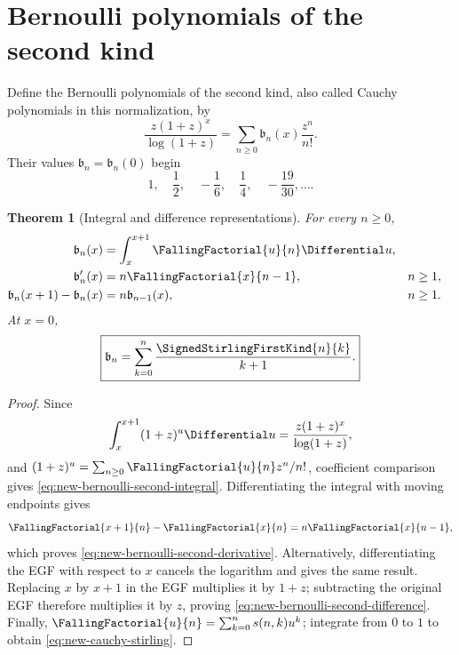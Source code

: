 \documentclass[11pt,a4paper,oneside,openany]{book}
\newtheorem{theorem}{Theorem}[chapter]
\theoremstyle{definition}
\theoremstyle{remark}
\begin{document}
\section{Bernoulli polynomials of the second kind}

Define the Bernoulli polynomials of the second kind, also called Cauchy
polynomials in this normalization, by
\begin{equation}\label{eq:new-bernoulli-second-egf}
 \frac{z(1+z)^x}{\log(1+z)}
 =\sum_{n\ge0}\mathfrak b_n(x)\frac{z^n}{n!}.
\end{equation}
Their values $\mathfrak b_n=\mathfrak b_n(0)$ begin
\[
 1,\quad \frac12,\quad-\frac16,\quad\frac14,\quad-\frac{19}{30},\ldots.
\]

\begin{theorem}[Integral and difference representations]\label{thm:new-bernoulli-second}
For every $n\ge0$,
\begin{align}
 \mathfrak b_n(x)&=\int_x^{x+1}\FallingFactorial{u}{n}\Differential u,
 \label{eq:new-bernoulli-second-integral}\\
 \mathfrak b_n'(x)&=n\FallingFactorial{x}{n-1}, &&n\ge1,
 \label{eq:new-bernoulli-second-derivative}\\
 \mathfrak b_n(x+1)-\mathfrak b_n(x)&=n\mathfrak b_{n-1}(x), &&n\ge1.
 \label{eq:new-bernoulli-second-difference}
\end{align}
At $x=0$,
\begin{equation}\label{eq:new-cauchy-stirling}
 \boxed{\displaystyle
 \mathfrak b_n=\sum_{k=0}^n\frac{\SignedStirlingFirstKind{n}{k}}{k+1}.}
\end{equation}
\end{theorem}

\begin{proof}
Since
\[
 \int_x^{x+1}(1+z)^u\Differential u
 =\frac{z(1+z)^x}{\log(1+z)},
\]
and $(1+z)^u=\sum_{n\ge0}\FallingFactorial{u}{n}z^n/n!$, coefficient comparison
gives \eqref{eq:new-bernoulli-second-integral}.  Differentiating the integral
with moving endpoints gives
\[
 \FallingFactorial{x+1}{n}-\FallingFactorial{x}{n}=n\FallingFactorial{x}{n-1},
\]
which proves \eqref{eq:new-bernoulli-second-derivative}.  Alternatively,
differentiating the EGF with respect to $x$ cancels the logarithm and gives the
same result.  Replacing $x$ by $x+1$ in the EGF multiplies it by $1+z$;
subtracting the original EGF therefore multiplies it by $z$, proving
\eqref{eq:new-bernoulli-second-difference}.  Finally,
$\FallingFactorial{u}{n}=\sum_{k=0}^ns(n,k)u^k$; integrate from $0$ to $1$ to obtain
\eqref{eq:new-cauchy-stirling}.
\end{proof}
\end{document}
